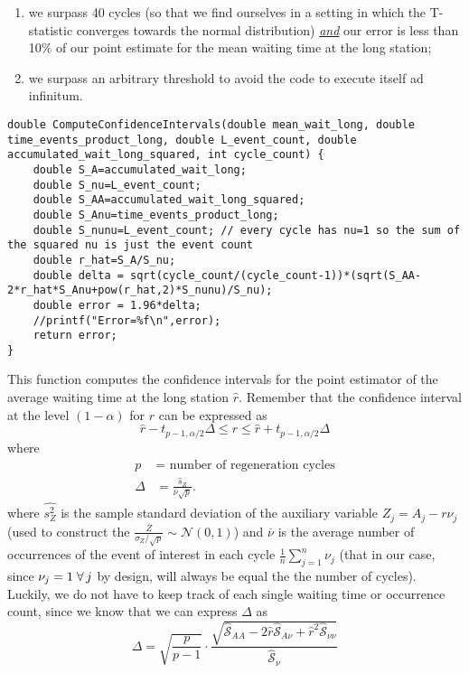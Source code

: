\documentclass[12pt]{article}
\begin{document}
\begin{enumerate}
	\item we surpass 40 cycles (so that we find ourselves in a setting in which the T-statistic converges towards the normal distribution) \underline{\textit{and}} our error is less than 10\% of our point estimate for the mean waiting time at the long station;
	\item we surpass an arbitrary threshold  to avoid the code to execute itself ad infinitum.
\end{enumerate}
\begin{lstlisting}
double ComputeConfidenceIntervals(double mean_wait_long, double time_events_product_long, double L_event_count, double accumulated_wait_long_squared, int cycle_count) {
	double S_A=accumulated_wait_long;
	double S_nu=L_event_count;
	double S_AA=accumulated_wait_long_squared;
	double S_Anu=time_events_product_long;
	double S_nunu=L_event_count; // every cycle has nu=1 so the sum of the squared nu is just the event count
	double r_hat=S_A/S_nu;
	double delta = sqrt(cycle_count/(cycle_count-1))*(sqrt(S_AA-2*r_hat*S_Anu+pow(r_hat,2)*S_nunu)/S_nu);
	double error = 1.96*delta;
	//printf("Error=%f\n",error);
	return error;
}
\end{lstlisting}
This function computes the confidence intervals for the point estimator of the average waiting time at the long station $\hat{r}$. Remember that the confidence interval at the level $(1-\alpha)$ for $r$ can be expressed as
\begin{equation*}
	\hat{r}-t_{p-1,\alpha/2}\Delta\leq r\leq\hat{r}+t_{p-1,\alpha/2}\Delta
\end{equation*} 
where
\begin{align*}
	p&=\text{ number of regeneration cycles}\\
	\Delta&=\frac{\hat{s}_{Z}}{\overline{\nu}\sqrt{p}}.
\end{align*}
where $\hat{s^{2}_{Z}}$ is the sample standard deviation of the auxiliary variable $Z_j=A_j-r\nu_j$ (used to construct the \rv{} $\frac{\overline{Z}}{\sigma_{Z}/\sqrt{p}}\sim\mathscr{N}(0,1)$) and $\overline{\nu}$ is the average number of occurrences of the event of interest in each cycle $\frac{1}{n}\sum_{j=1}^{n}\nu_j$ (that in our case, since $\nu_j=1\;\forall\, j$ by design, will always be equal the the number of cycles).\\
Luckily, we do not have to keep track of each single waiting time or occurrence count, since we know that we can express $\Delta$ as
\begin{equation*}
	\Delta=\sqrt{\frac{p}{p-1}}\cdot\frac{\sqrt{\hat{\mathcal{S}}_{AA}-2\hat{r}\hat{\mathcal{S}}_{A\nu}+\hat{r}^{2}\hat{\mathcal{S}}_{\nu\nu}}}{\hat{\mathcal{S}}_{\nu}}
\end{equation*}
\end{document}
